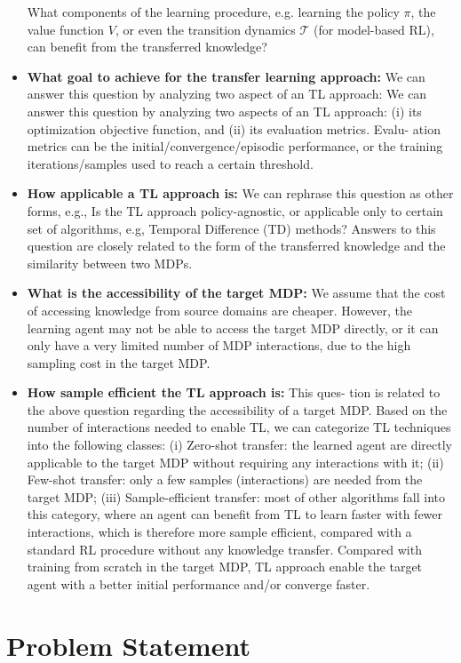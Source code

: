 \documentclass[letterpaper%
, oneside%
, 12pt%
,thesepararticles%
, english%
,creativecommons,hyperref, withAlgo2e%
]{thETS}
\begin{document}
\begin{itemize}
What components of the learning procedure, e.g. learning the policy $\displaystyle \pi $, the value function $\displaystyle V$, or even the transition dynamics $\displaystyle \mathcal{T}$ (for model-based RL), can benefit from the transferred knowledge?
\item \textbf{What goal to achieve for the transfer learning approach:} We can answer this question by analyzing two aspect of an TL approach: We can answer this question by analyzing two aspects of an TL approach: (i) its optimization objective function, and (ii) its evaluation metrics. Evalu- ation metrics can be the initial/convergence/episodic performance, or the training iterations/samples used to reach a certain threshold.
\item \textbf{How applicable a TL approach is:} We can rephrase this question as other forms, e.g., Is the TL approach policy-agnostic, or applicable only to certain set of algorithms, e.g, Temporal Difference (TD) methods? Answers to this question are closely related to the form of the transferred knowledge and the similarity between two MDPs.
\item \textbf{What is the accessibility of the target MDP: }We assume that the cost of accessing knowledge from source domains are cheaper. However, the learning agent may not be able to access the target MDP directly, or it can only have a very limited number of MDP interactions, due to the high sampling cost in the target MDP.
\item \textbf{How sample efficient the TL approach is:} This ques- tion is related to the above question regarding the accessibility of a target MDP. Based on the number of interactions needed to enable TL, we can categorize TL techniques into the following classes: (i) Zero-shot transfer: the learned agent are directly applicable to the target MDP without requiring any interactions with it; (ii) Few-shot transfer: only a few samples (interactions) are needed from the target MDP; (iii) Sample-efficient transfer: most of other algorithms fall into this category, where an agent can benefit from TL to learn faster with fewer interactions, which is therefore more sample efficient, compared with a standard RL procedure without any knowledge transfer. Compared with training from scratch in the target MDP, TL approach enable the target agent with a better initial performance and/or converge faster.
\end{itemize}




\section{Problem Statement}
\end{document}

